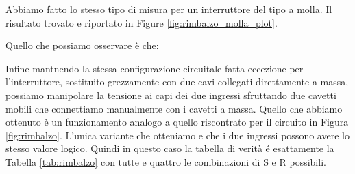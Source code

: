 Abbiamo fatto lo stesso tipo di misura per un interruttore del tipo a molla. Il risultato trovato e riportato in Figure \ref{fig:rimbalzo_molla_plot}.

Quello che possiamo osservare è che:

Infine mantnendo la stessa configurazione circuitale fatta eccezione per l'interruttore, sostituito grezzamente con due cavi collegati direttamente a massa, possiamo manipolare la tensione ai capi dei due ingressi sfruttando due cavetti mobili che connettiamo manualmente con i cavetti a massa.
Quello che abbiamo ottenuto è un funzionamento analogo a quello riscontrato per il circuito in Figura \ref{fig:rimbalzo}.
L'unica variante che otteniamo e che i due ingressi possono avere lo stesso valore logico. Quindi in questo caso la tabella di verità é esattamente la Tabella \ref{tab:rimbalzo} con tutte e quattro le combinazioni di S e R possibili. 











